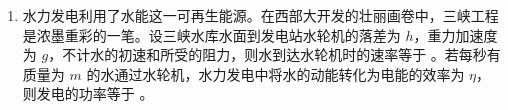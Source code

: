 \documentclass[\gkver]{gaokaozhenti}
\begin{document}
\begin{enumerate}
{（3）根据闭合电路欧姆定律 $I=\frac{E}{R+r}$ ⑤，代入数据解得 $E=20\UV$ ⑥。

（4）$S_{1}$ 闭合而 $S_{2}$ 断开，电路中的总电流 $I'=\frac{E}{R_{1}+R_{2}+r}$ ⑦，电压表示数 $U'=I'(R_{1}+R_{2})$ ⑧，代入数据解得 $U'=16\UV$ ⑨。

评分标准：本题共 9 分，其中第（1）～（3）问各 2 分，第（4）问 3 分。第（1）～（3）问中，①～⑥式各给 1 分。第（4）问中，⑦～⑨式各给 1 分。其他解法，只要正确可参照以上标准给分。
}

\item
水力发电利用了水能这一可再生能源。在西部大开发的壮丽画卷中，三峡工程是浓墨重彩的一笔。设三峡水库水面到发电站水轮机的落差为 $h$，重力加速度为 $g$，不计水的初速和所受的阻力，则水到达水轮机时的速率等于 。若每秒有质量为 $m$ 的水通过水轮机，水力发电中将水的动能转化为电能的效率为 $\eta$，则发电的功率等于 。



\end{enumerate}
\end{document}
